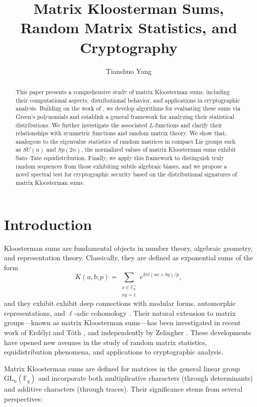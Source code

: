 \documentclass[11pt]{article}
\title{Matrix Kloosterman Sums, Random Matrix Statistics, and Cryptography}
\author{Tianshuo Yang}
\date{}
\newcommand{\Fq}{\mathbb{F}_q}
\newcommand{\GL}{\mathrm{GL}}
\begin{document}
\maketitle

\begin{abstract}
This paper presents a comprehensive study of matrix Kloosterman sums, including their computational aspects, distributional behavior, and applications in cryptographic analysis. Building on the work of \cite{zelingher2023matrix}, we develop algorithms for evaluating these sums via Green’s polynomials and establish a general framework for analyzing their statistical distributions. We further investigate the associated $L$-functions and clarify their relationships with symmetric functions and random matrix theory.
We show that, analogous to the eigenvalue statistics of random matrices in compact Lie groups such as $SU(n)$ and $Sp(2n)$, the normalized values of matrix Kloosterman sums exhibit Sato–Tate equidistribution. 
Finally, we apply this framework to distinguish truly random sequences from those exhibiting subtle algebraic biases, and we propose a novel spectral test for cryptographic security based on the distributional signatures of matrix Kloosterman sums.
\end{abstract}

\section{Introduction}

Kloosterman sums are fundamental objects in number theory, algebraic geometry, and representation theory. Classically, they are defined as exponential sums of the form
\[
K(a,b;p) = \sum_{\substack{x \in \mathbb{F}_p^\times \\ xy = 1}} e^{2\pi i (ax + by)/p},
\]
and they exhibit exhibit deep connections with modular forms, automorphic representations, and $\ell$-adic cohomology \cite{Katz88}. Their natural extension to matrix groups—known as matrix Kloosterman sums—has been investigated in recent work of Erd\'{e}lyi and T\'{o}th \cite{erdelyi2021matrix}, and independently by Zelingher \cite{zelingher2023matrix}. These developments have opened new avenues in the study of random matrix statistics, equidistribution phenomena, and applications to cryptographic analysis.

Matrix Kloosterman sums are defined for matrices in the general linear group $\GL_n(\Fq)$ and incorporate both multiplicative characters (through determinants) and additive characters (through traces). Their significance stems from several perspectives:
\end{document}
